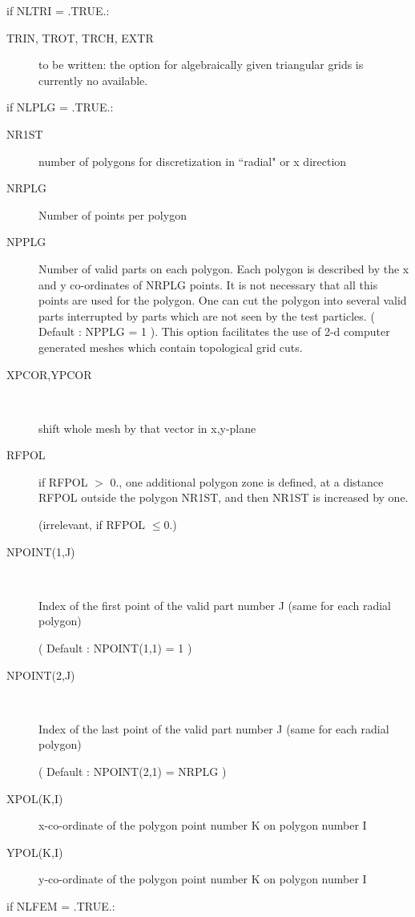 if NLTRI = .TRUE.:
\begin{description}
  \item[TRIN, TROT, TRCH, EXTR] to be written: the option for algebraically given
        triangular grids is currently no available.

\end{description}
if NLPLG = .TRUE.:
\begin{description}
  \item[NR1ST] number of polygons for discretization in ``radial" or x direction
  \item[NRPLG] Number of points per polygon
  \item[NPPLG] Number of valid parts on
        each polygon.
        Each polygon is described by the x and y co-ordinates of NRPLG points.
        It is not necessary that all this points are used for the polygon.
        One can cut the polygon into several valid parts interrupted by parts which are
        not seen by the test particles.
        ( Default :
        NPPLG = 1 ).
        This option facilitates the use of 2-d computer generated meshes which contain
        topological grid cuts.
  \item[XPCOR,YPCOR] ~ 

        shift whole mesh by that vector in x,y-plane
  \item[RFPOL] if RFPOL $>$ 0., one
        additional polygon zone is defined, at a distance RFPOL outside the polygon
        NR1ST, and then NR1ST is increased by one.

        (irrelevant, if RFPOL $\le 0$.)
  \item[NPOINT(1,J)] ~ 

        Index of the first point of the valid part number J (same for each radial
        polygon) 

        ( Default : NPOINT(1,1) = 1 )
  \item[NPOINT(2,J)] ~ 

        Index of the last point of the valid part number J (same for each radial
        polygon) 

        ( Default : NPOINT(2,1) = NRPLG )
  \item[XPOL(K,I)] x-co-ordinate of the polygon
        point number K on polygon number I
  \item[YPOL(K,I)] y-co-ordinate of the
        polygon point number K on polygon number I
\end{description}
if NLFEM = .TRUE.:
